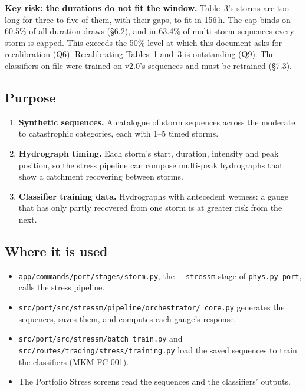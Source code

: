 \documentclass[11pt,a4paper]{article}
\begin{document}
\textbf{Key risk: the durations do not fit the window.} Table~3's storms are too long for
three to five of them, with their gaps, to fit in 156\,h. The cap binds on 60.5\% of all
duration draws (\S6.2), and in 63.4\% of multi-storm sequences every storm is capped. This
exceeds the 50\% level at which this document asks for recalibration (Q6). Recalibrating
Tables~1 and~3 is outstanding (Q9). The classifiers on file were trained on v2.0's
sequences and must be retrained (\S7.3).

\mkmpurpose

\subsection{Purpose}
\begin{enumerate}[nosep]
    \item \textbf{Synthetic sequences.} A catalogue of storm sequences across the moderate
          to catastrophic categories, each with 1--5 timed storms.
    \item \textbf{Hydrograph timing.} Each storm's start, duration, intensity and peak
          position, so the stress pipeline can compose multi-peak hydrographs that show a
          catchment recovering between storms.
    \item \textbf{Classifier training data.} Hydrographs with antecedent wetness: a gauge
          that has only partly recovered from one storm is at greater risk from the next.
\end{enumerate}

\subsection{Where it is used}
\begin{itemize}[nosep]
    \item \texttt{app/commands/port/stages/storm.py}, the \texttt{-{}-stressm} stage of
          \texttt{phys.py port}, calls the stress pipeline.
    \item \texttt{src/port/src/stressm/pipeline/orchestrator/\_core.py} generates the
          sequences, saves them, and computes each gauge's response.
    \item \texttt{src/port/src/stressm/batch\_train.py} and
          \texttt{src/routes/trading/stress/training.py} load the saved sequences to train
          the classifiers (MKM-FC-001).
    \item The Portfolio Stress screens read the sequences and the classifiers' outputs.
\end{itemize}
\end{document}
